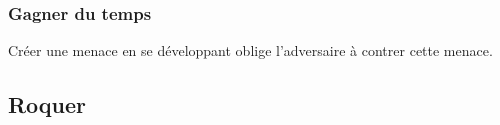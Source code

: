 \subsubsection{Gagner du temps}

Créer une menace en se développant oblige l'adversaire à contrer cette menace. 



\subsection{Roquer}
%



